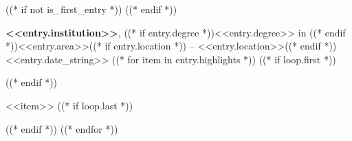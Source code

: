 ((* if not is_first_entry *))
\vspace{<<design.margins.entry_area.vertical_between>>}
((* endif *))

\begin{onecolentry}
    \textbf{<<entry.institution>>}, ((* if entry.degree *))<<entry.degree>> in ((* endif *))<<entry.area>>((* if entry.location *)) -- <<entry.location>>((* endif *)) \hfill <<entry.date_string>>
((* for item in entry.highlights *))
    ((* if loop.first *))
    \begin{highlights}
    ((* endif *))
        \item <<item>>
    ((* if loop.last *))
    \end{highlights}
    ((* endif *))
((* endfor *))
\end{onecolentry}